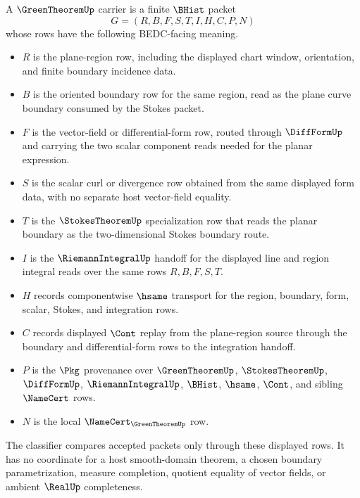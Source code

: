 \begin{definition}\label{def:green-theorem-carrier}
A $\GreenTheoremUp$ carrier is a finite $\BHist$ packet
$$
G=(R,B,F,S,T,I,H,C,P,N)
$$
whose rows have the following BEDC-facing meaning.
\begin{itemize}
\item $R$ is the plane-region row, including the displayed chart window, orientation, and finite boundary incidence data.
\item $B$ is the oriented boundary row for the same region, read as the plane curve boundary consumed by the Stokes packet.
\item $F$ is the vector-field or differential-form row, routed through $\DiffFormUp$ and carrying the two scalar component reads needed for the planar expression.
\item $S$ is the scalar curl or divergence row obtained from the same displayed form data, with no separate host vector-field equality.
\item $T$ is the $\StokesTheoremUp$ specialization row that reads the planar boundary as the two-dimensional Stokes boundary route.
\item $I$ is the $\RiemannIntegralUp$ handoff for the displayed line and region integral reads over the same rows $R,B,F,S,T$.
\item $H$ records componentwise $\hsame$ transport for the region, boundary, form, scalar, Stokes, and integration rows.
\item $C$ records displayed $\Cont$ replay from the plane-region source through the boundary and differential-form rows to the integration handoff.
\item $P$ is the $\Pkg$ provenance over $\GreenTheoremUp$, $\StokesTheoremUp$, $\DiffFormUp$, $\RiemannIntegralUp$, $\BHist$, $\hsame$, $\Cont$, and sibling $\NameCert$ rows.
\item $N$ is the local $\NameCert_{\GreenTheoremUp}$ row.
\end{itemize}
The classifier compares accepted packets only through these displayed rows. It has no coordinate for a host smooth-domain theorem, a chosen boundary parametrization, measure completion, quotient equality of vector fields, or ambient $\RealUp$ completeness.
\end{definition}

